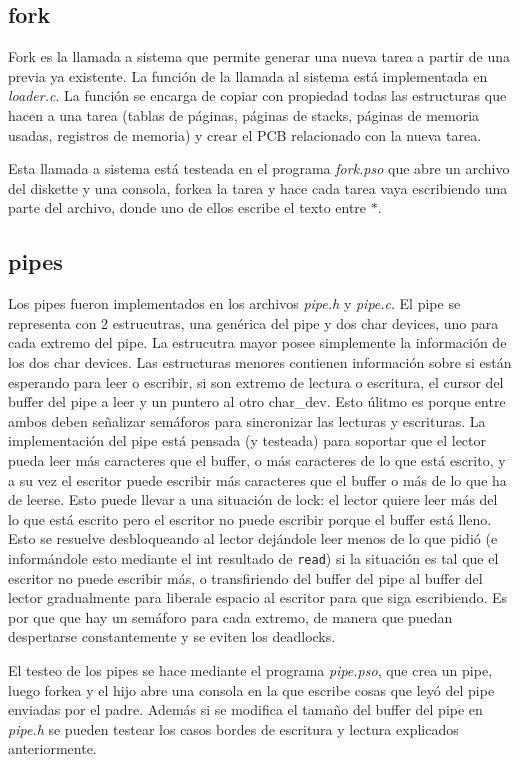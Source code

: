 \documentclass[a4paper]{article}
\newcommand{\file}[1]{\textit{#1}}
\newcommand{\func}[1]{\lstinline{#1}}
\begin{document}
\subsection{fork}
Fork es la llamada a sistema que permite generar una nueva tarea a partir de una previa ya existente. La función de la llamada al sistema está implementada en \file{loader.c}. La función se encarga de copiar con propiedad todas las estructuras que hacen a una tarea (tablas de páginas, páginas de stacks, páginas de memoria usadas, registros de memoria) y crear el PCB relacionado con la nueva tarea. 

Esta llamada a sistema está testeada en el programa \file{fork.pso} que abre un archivo del diskette y una consola, forkea la tarea y hace cada tarea vaya escribiendo una parte del archivo, donde uno de ellos escribe el texto entre $*$.


\subsection{pipes}
Los pipes fueron implementados en los archivos \file{pipe.h} y \file{pipe.c}. El pipe se representa con 2 estrucutras, una genérica del pipe y dos char devices, uno para cada extremo del pipe. La estrucutra mayor posee simplemente la información de los dos char devices. Las estructuras menores contienen información sobre si están esperando para leer o escribir, si son extremo de lectura o escritura, el cursor del buffer del pipe a leer y un puntero al otro char_dev. Esto úlitmo es porque entre ambos deben señalizar semáforos para sincronizar las lecturas y escrituras. La implementación del pipe está pensada (y testeada) para soportar que el lector pueda leer más caracteres que el buffer, o más caracteres de lo que está escrito, y a su vez el escritor puede escribir más caracteres que el buffer o más de lo que ha de leerse. Esto puede llevar a una situación de lock: el lector quiere leer más del lo que está escrito pero el escritor no puede escribir porque el buffer está lleno. Esto se resuelve desbloqueando al lector dejándole leer menos de lo que pidió (e informándole esto mediante el int resultado de \func{read}) si la situación es tal que el escritor no puede escribir más, o transfiriendo del buffer del pipe al buffer del lector gradualmente para liberale espacio al escritor para que siga escribiendo. Es por que que hay un semáforo para cada extremo, de manera que puedan despertarse constantemente y se eviten los deadlocks.

El testeo de los pipes se hace mediante el programa \file{pipe.pso}, que crea un pipe, luego forkea y el hijo abre una consola en la que escribe cosas que leyó del pipe enviadas por el padre. Además si se modifica el tamaño del buffer del pipe en \file{pipe.h} se pueden testear los casos bordes de escritura y lectura explicados anteriormente.
\end{document}
